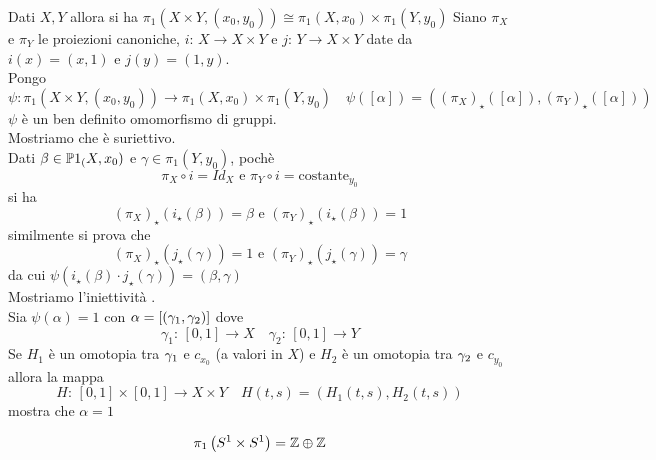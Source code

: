 \spazio 
\begin{thm}Dati $X,Y $ allora si ha $\pi_1(X\times Y, (x_0, y_0) ) \cong \pi_1(X,x_0) \times \pi_1(Y,y_0)$
\proof Siano $\pi_X$ e $\pi_Y$ le proiezioni canoniche, $i:\, X \to X\times Y $ e $j:\, Y \to X\times Y$ date da $i(x)=(x,1)$ e $j(y)=(1,y)$.\\
Pongo 
$$ \psi: \pi_1 ( X\times Y, (x_0, y_0)) \to \pi_1 (X,x_0) \times \pi_1(Y,y_0) \quad \psi([\alpha])=\left( \left( \pi_X \right)_\star([\alpha]), \left( \pi_Y \right)_\star ([\alpha]) \right)$$
$\psi$ \`e un ben definito omomorfismo di gruppi.\\ 
Mostriamo che \`e suriettivo.\\
 Dati $\beta\in \mathbb{P}1_(X,x_0)$ e $\gamma\in \pi_1(Y,y_0)$, poch\`e 
 $$\pi_X \circ i =Id_X \text{ e } \pi_Y \circ i = \text{costante}_{y_0}$$
si ha 
$$ \left( \pi_X \right)_\star \left( i_\star(\beta) \right)=\beta \text{ e } \left( \pi_Y \right)_\star \left( i_\star(\beta) \right)=1 $$ 
similmente si prova che 
$$ \left( \pi_X \right)_\star \left( j_\star(\gamma) \right)=1 \text{ e } \left( \pi_Y \right)_\star \left( j_\star(\gamma) \right)=\gamma $$ 
da cui $\psi\left( i_\star(\beta) \cdot j_\star(\gamma) \right)= (\beta, \gamma)$\\
Mostriamo l'iniettivit\`a .\\
Sia $\psi(\alpha)=1 $ con $\alpha=\left[ \left( \gamma_1, \gamma_2 \right)\right]$ dove 
$$ \gamma_1:\, [0,1]\to X \quad  \gamma_2:\, [0,1]\to Y$$
Se $H_1$ \`e un omotopia tra $\gamma_1 $ e $c_{x_0}$ (a valori in $X$) e $H_2$ \`e un omotopia tra $\gamma_2$ e $c_{y_0}$ allora la mappa
$$ H :\, [0,1]\times [0,1]\to X \times Y \quad H(t,s)=\left( H_1(t,s), H_2(t,s) \right)$$ 
mostra che $\alpha=1$\\
\endproof
\end{thm}
\begin{cor}
\end{cor} $$ \pi_1\left( S^1 \times S^1 \right) = \mathbb{Z} \oplus \mathbb{Z}$$
